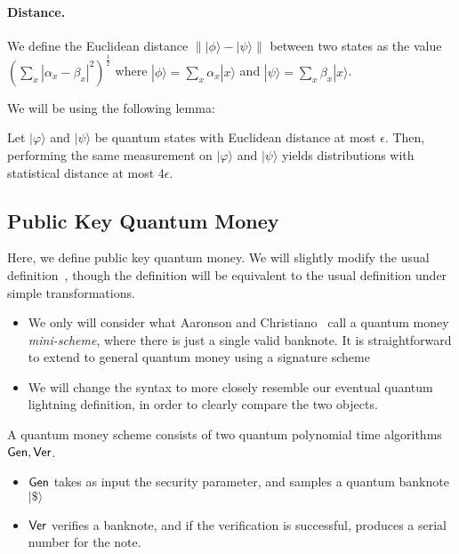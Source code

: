 \paragraph{Distance.}We define the Euclidean distance $\||\phi\rangle-|\psi\rangle\|$ between two states as the value $\left(\sum_x |\alpha_x-\beta_x|^2\right)^{\frac{1}{2}}$ where $|\phi\rangle=\sum_x \alpha_x|x\rangle$ and $|\psi\rangle=\sum_x\beta_x|x\rangle$. 	

We will be using the following lemma:
\begin{lemma}\label{lemma:distance} Let $|\varphi\rangle$ and $|\psi\rangle$ be quantum states with Euclidean distance at most $\epsilon$. Then, performing the same measurement on $|\varphi\rangle$ and $|\psi\rangle$ yields distributions with statistical distance at most
	$4\epsilon$.\end{lemma}



\subsection{Public Key Quantum Money}

Here, we define public key quantum money.  We will slightly modify the usual definition~\cite{CCC:Aaronson09}, though the definition will be equivalent to the usual definition under simple transformations.
\begin{itemize}
	\item We only will consider what Aaronson and Christiano~\cite{STOC:AarChr12} call a quantum money \emph{mini-scheme}, where there is just a single valid banknote.  It is straightforward to extend to general quantum money using a signature scheme
	\item We will change the syntax to more closely resemble our eventual quantum lightning definition, in order to clearly compare the two objects.
\end{itemize}

\noindent A quantum money scheme consists of two quantum polynomial time algorithms ${\sf Gen},{\sf Ver}$.
\begin{itemize}
	\item ${\sf Gen}$ takes as input the security parameter, and samples a quantum banknote $|\$\rangle$
	\item ${\sf Ver}$ verifies a banknote, and if the verification is successful, produces a serial number for the note.
\end{itemize}

